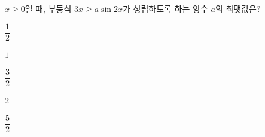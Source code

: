 $x\ge 0$일 때, 부등식 $3x\ge a\sin 2x$가 성립하도록 하는 양수 $a$의 최댓값은?
\begin{choices32}{\rule[-3ex]{0pt}{8ex}$\dfrac{1}{2}$}{\rule[-3ex]{0pt}{8ex}$1$}{\rule[-3ex]{0pt}{8ex}$\dfrac{3}{2}$}{\rule[-3ex]{0pt}{8ex}$2$}{\rule[-3ex]{0pt}{8ex}$\dfrac{5}{2}$}\end{choices32}
